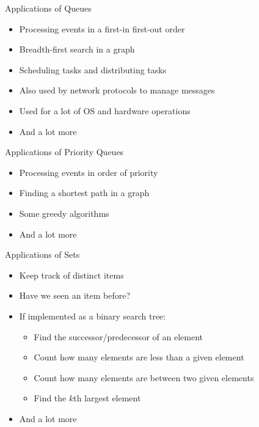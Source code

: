 \documentclass{beamer}
\begin{document}

\begin{frame}{Applications of Queues}
    \begin{itemize}
        \item<1-> Processing events in a first-in first-out order
        \item<2-> Breadth-first search in a graph
        \item<3-> Scheduling tasks and distributing tasks
        \item<4-> Also used by network protocols to manage messages
        \item<5-> Used for a lot of OS and hardware operations
        \item<6-> And a lot more
    \end{itemize}
\end{frame}

\begin{frame}{Applications of Priority Queues}
    \begin{itemize}
        \item<1-> Processing events in order of priority
        \item<2-> Finding a shortest path in a graph
        \item<3-> Some greedy algorithms
        \item<4-> And a lot more
    \end{itemize}
\end{frame}

\begin{frame}{Applications of Sets}
    \begin{itemize}
        \item<1-> Keep track of distinct items
        \item<2-> Have we seen an item before?
        \item<3-> If implemented as a binary search tree:
        \begin{itemize}
            \item<4-> Find the successor/predecessor of an element
            \item<5-> Count how many elements are less than a given element
            \item<6-> Count how many elements are between two given elements
            \item<7-> Find the $k$th largest element
        \end{itemize}
        \item<8-> And a lot more
    \end{itemize}
\end{frame}
\end{document}
